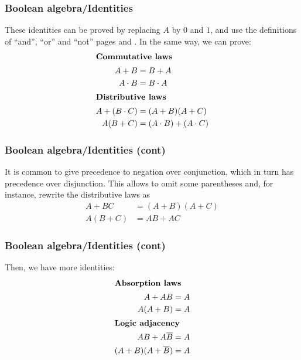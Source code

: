 % 
\begin{frame}
\frametitle{Boolean algebra/Identities}

These identities can be proved by replacing \(A\) by \(0\) and \(1\),
and use the definitions of ``and'', ``or'' and ``not''
pages \pageref{def_and_or} and \pageref{def_not}. In the same way, we
can prove:
\begin{align}
\intertext{\textbf{Commutative laws}}
A + B &= B + A \label{or:comm}\\
A \cdot B &= B \cdot A \label{and:comm}\\
\intertext{\textbf{Distributive laws}}
A + (B \cdot C) &= (A + B)(A + C) \label{or_and:dist}\\
A(B + C) &= (A \cdot B) + (A \cdot C) \label{and_or:dist}
\end{align}

\end{frame}

% 
\begin{frame}
\frametitle{Boolean algebra/Identities (cont)}

It is common to give precedence to negation over conjunction, which in
turn has precedence over disjunction. This allows to omit some
parentheses and, for instance, rewrite the distributive laws as
\begin{align*}
A + B C &= (A + B)(A + C)\\
A(B + C) &= A B + A C
\end{align*}

\end{frame}

% 
\begin{frame}
\frametitle{Boolean algebra/Identities (cont)}

Then, we have more identities:
\begin{align}
\intertext{\textbf{Absorption laws}}
A + A B &= A \label{or_and:absorp}\\
A (A + B) &= A \label{and_or:absorp}\\
\intertext{\textbf{Logic adjacency}}
A B + A \overline{B} &= A \label{or_and:adj}\\
(A + B)(A + \overline{B}) &= A \label{and_or:adj}
\end{align}

\end{frame}

